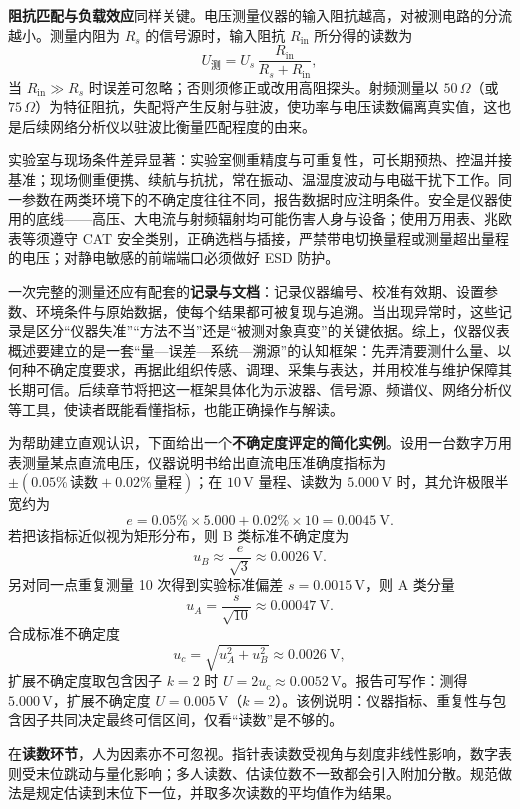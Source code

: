 \textbf{阻抗匹配与负载效应}同样关键。电压测量仪器的输入阻抗越高，对被测电路的分流越小。测量内阻为 $R_s$ 的信号源时，输入阻抗 $R_{\mathrm{in}}$ 所分得的读数为
\[
    U_{\mathrm{测}} = U_s\,\frac{R_{\mathrm{in}}}{R_s + R_{\mathrm{in}}} ,
\]
当 $R_{\mathrm{in}}\gg R_s$ 时误差可忽略；否则须修正或改用高阻探头。射频测量以 $50\,\Omega$（或 $75\,\Omega$）为特征阻抗，失配将产生反射与驻波，使功率与电压读数偏离真实值，这也是后续网络分析仪以驻波比衡量匹配程度的由来。

实验室与现场条件差异显著：实验室侧重精度与可重复性，可长期预热、控温并接基准；现场侧重便携、续航与抗扰，常在振动、温湿度波动与电磁干扰下工作。同一参数在两类环境下的不确定度往往不同，报告数据时应注明条件。安全是仪器使用的底线——高压、大电流与射频辐射均可能伤害人身与设备；使用万用表、兆欧表等须遵守 CAT 安全类别，正确选档与插接，严禁带电切换量程或测量超出量程的电压；对静电敏感的前端端口必须做好 ESD 防护。

一次完整的测量还应有配套的\textbf{记录与文档}：记录仪器编号、校准有效期、设置参数、环境条件与原始数据，使每个结果都可被复现与追溯。当出现异常时，这些记录是区分“仪器失准”“方法不当”还是“被测对象真变”的关键依据。综上，仪器仪表概述要建立的是一套“量—误差—系统—溯源”的认知框架：先弄清要测什么量、以何种不确定度要求，再据此组织传感、调理、采集与表达，并用校准与维护保障其长期可信。后续章节将把这一框架具体化为示波器、信号源、频谱仪、网络分析仪等工具，使读者既能看懂指标，也能正确操作与解读。

为帮助建立直观认识，下面给出一个\textbf{不确定度评定的简化实例}。设用一台数字万用表测量某点直流电压，仪器说明书给出直流电压准确度指标为 $\pm(0.05\%\,\text{读数}+0.02\%\,\text{量程})$；在 $10\,\mathrm{V}$ 量程、读数为 $5.000\,\mathrm{V}$ 时，其允许极限半宽约为
\[
    e = 0.05\%\times 5.000 + 0.02\%\times 10 = 0.0045\ \mathrm{V}.
\]
若把该指标近似视为矩形分布，则 B 类标准不确定度为
\[
    u_B \approx \frac{e}{\sqrt{3}} \approx 0.0026\ \mathrm{V}.
\]
另对同一点重复测量 10 次得到实验标准偏差 $s=0.0015\,\mathrm{V}$，则 A 类分量
\[
    u_A = \frac{s}{\sqrt{10}} \approx 0.00047\ \mathrm{V}.
\]
合成标准不确定度
\[
    u_c = \sqrt{u_A^2 + u_B^2} \approx 0.0026\ \mathrm{V},
\]
扩展不确定度取包含因子 $k=2$ 时 $U=2u_c\approx 0.0052\,\mathrm{V}$。报告可写作：测得 $5.000\,\mathrm{V}$，扩展不确定度 $U=0.005\,\mathrm{V}$（$k=2$）。该例说明：仪器指标、重复性与包含因子共同决定最终可信区间，仅看“读数”是不够的。

在\textbf{读数环节}，人为因素亦不可忽视。指针表读数受视角与刻度非线性影响，数字表则受末位跳动与量化影响；多人读数、估读位数不一致都会引入附加分散。规范做法是规定估读到末位下一位，并取多次读数的平均值作为结果。

